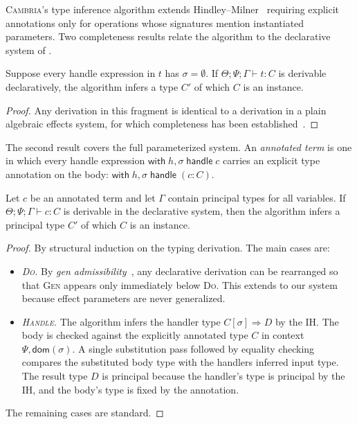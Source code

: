 \documentclass[acmsmall,screen,review,anonymous]{acmart}
\newcommand{\cambria}{\textsc{Cambria}}
\newcommand{\with}{\mathsf{with}\;}
\newcommand{\handle}{\;\mathsf{handle}\;}
\newcommand{\dom}{\mathsf{dom}}
\newcommand{\G}{\Gamma}
\newcommand{\cjp}[5]{#1; #2; #3 \vdash #4 : #5}
\begin{document}
\cambria{}'s type inference algorithm extends Hindley--Milner~\cite{damas_principal_1982}
requiring explicit annotations only for operations whose signatures mention instantiated parameters.
Two completeness results relate the algorithm to the declarative system of .

\begin{lemma} \label{thm:ground-complete}
  Suppose every handle expression in $t$ has $\sigma = \emptyset$.
  If $\cjp{\Theta}{\Psi}{\G}{t}{C}$ is derivable declaratively, the algorithm infers
  a type $C'$ of which $C$ is an instance.
\end{lemma}

\begin{proof}
  Any derivation in this fragment is identical to a derivation in a plain algebraic effects system,
  for which completeness has been established~\cite{damas_principal_1982, kammar_no_2017}.
\end{proof}

The second result covers the full parameterized system.
An \emph{annotated term} is one in which every handle expression
$\with h, \sigma \handle c$ carries an explicit type annotation on the body:
$\with h, \sigma \handle (c : C)$.

\begin{theorem}\label{thm:param-complete}
  Let $c$ be an annotated term and let $\G$ contain principal types for all variables.
  If $\cjp{\Theta}{\Psi}{\G}{c}{C}$ is derivable in the declarative system, then the
  algorithm infers a principal type $C'$ of which $C$ is an instance.
\end{theorem}

\begin{proof}
  By structural induction on the typing derivation. The main cases are:
  \begin{itemize}
    \item \emph{\textsc{Do}.}
          By \emph{gen admissibility}~\cite{damas_principal_1982}, any declarative derivation
          can be rearranged so that \textsc{Gen} appears only immediately below
          \textsc{Do}. This extends to our system because effect parameters are never generalized.

    \item \emph{\textsc{Handle}.}
          The algorithm infers the handler type
          $C[\sigma] \Rightarrow D$ by the IH. The body is checked against the
          explicitly annotated type $C$ in context $\Psi, \dom(\sigma)$.
          A single substitution pass followed by equality checking compares the
          substituted body type with the handlers inferred input type.
          The result type $D$ is principal because the handler's type is principal
          by the IH, and the body's type is fixed by the annotation.
  \end{itemize}
  The remaining cases are standard.
\end{proof}
\end{document}
